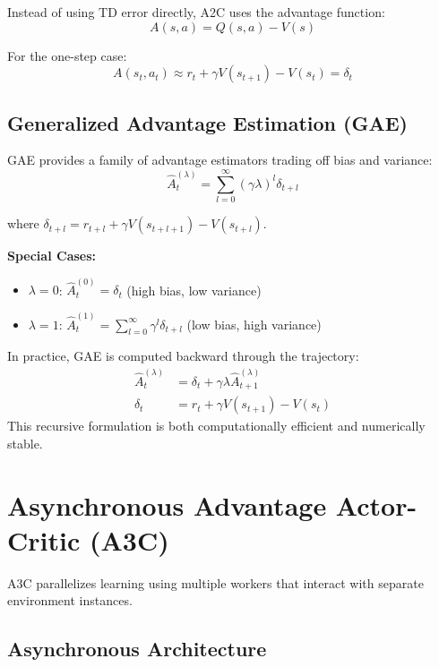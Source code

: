 Instead of using TD error directly, A2C uses the advantage function:
\begin{equation}
A(s,a) = Q(s,a) - V(s)
\end{equation}

For the one-step case:
\begin{equation}
A(s_t, a_t) \approx r_t + \gamma V(s_{t+1}) - V(s_t) = \delta_t
\end{equation}

\subsection{Generalized Advantage Estimation (GAE)}

GAE provides a family of advantage estimators trading off bias and variance:
\begin{equation}
\hat{A}_t^{(\lambda)} = \sum_{l=0}^\infty (\gamma \lambda)^l \delta_{t+l}
\end{equation}

where $\delta_{t+l} = r_{t+l} + \gamma V(s_{t+l+1}) - V(s_{t+l})$.

\textbf{Special Cases:}
\begin{itemize}
    \item $\lambda = 0$: $\hat{A}_t^{(0)} = \delta_t$ (high bias, low variance)
    \item $\lambda = 1$: $\hat{A}_t^{(1)} = \sum_{l=0}^\infty \gamma^l \delta_{t+l}$ (low bias, high variance)
\end{itemize}

\begin{remarkbox}
In practice, GAE is computed backward through the trajectory:
\begin{align}
\hat{A}_t^{(\lambda)} &= \delta_t + \gamma \lambda \hat{A}_{t+1}^{(\lambda)} \\
\delta_t &= r_t + \gamma V(s_{t+1}) - V(s_t)
\end{align}
This recursive formulation is both computationally efficient and numerically stable.
\end{remarkbox}

\section{Asynchronous Advantage Actor-Critic (A3C)}

A3C parallelizes learning using multiple workers that interact with separate environment instances.

\subsection{Asynchronous Architecture}

